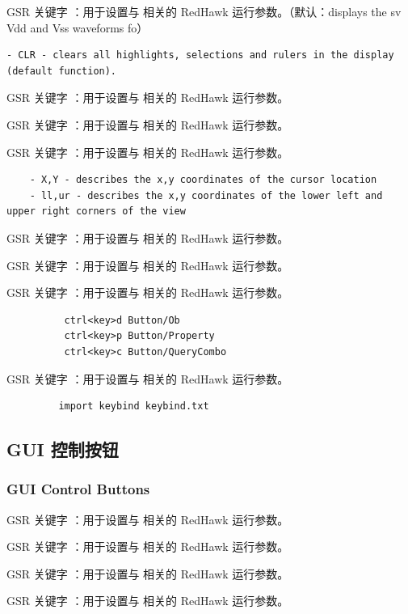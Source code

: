 GSR 关键字 ：用于设置与  相关的 RedHawk 运行参数。（默认：displays the sv Vdd and Vss waveforms fo）

\begin{lstlisting}
- CLR - clears all highlights, selections and rulers in the display (default function).
\end{lstlisting}

GSR 关键字 ：用于设置与  相关的 RedHawk 运行参数。

GSR 关键字 ：用于设置与  相关的 RedHawk 运行参数。

GSR 关键字 ：用于设置与  相关的 RedHawk 运行参数。

\begin{lstlisting}
    - X,Y - describes the x,y coordinates of the cursor location
    - ll,ur - describes the x,y coordinates of the lower left and upper right corners of the view
\end{lstlisting}

GSR 关键字 ：用于设置与  相关的 RedHawk 运行参数。

GSR 关键字 ：用于设置与  相关的 RedHawk 运行参数。

GSR 关键字 ：用于设置与  相关的 RedHawk 运行参数。

\begin{lstlisting}
          ctrl<key>d Button/Ob
          ctrl<key>p Button/Property
          ctrl<key>c Button/QueryCombo
\end{lstlisting}

GSR 关键字 ：用于设置与  相关的 RedHawk 运行参数。

\begin{lstlisting}
         import keybind keybind.txt
\end{lstlisting}

\subsection{GUI 控制按钮}
\subsubsection*{GUI Control Buttons}

GSR 关键字 ：用于设置与  相关的 RedHawk 运行参数。

GSR 关键字 ：用于设置与  相关的 RedHawk 运行参数。

GSR 关键字 ：用于设置与  相关的 RedHawk 运行参数。

GSR 关键字 ：用于设置与  相关的 RedHawk 运行参数。

